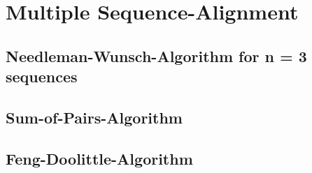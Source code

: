 \section{Multiple Sequence-Alignment}
\label{sec:multi_alignment}

\subsection{Needleman-Wunsch-Algorithm for n = 3 sequences}
\label{sec:needleman_multi}

\subsection{Sum-of-Pairs-Algorithm}
\label{sec:sum_of_pairs}

\subsection{Feng-Doolittle-Algorithm}
\label{sec:feng_doolittle}
